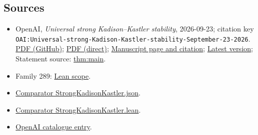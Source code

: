 \documentclass[11pt]{article}
\begin{document}
\subsection{Sources}
\begin{itemize}
\item OpenAI, \emph{Universal strong Kadison–Kastler stability}, 2026-09-23; citation key \texttt{OAI:Universal-strong-Kadison-Kastler-stability-September-23-2026}. \href{https://github.com/openai/math/blob/adc7f1241b42e322a6451854ab7e4b4c146bf78a/preprints/Universal-strong-Kadison-Kastler-stability-September-23-2026/paper.pdf}{PDF (GitHub)}; \href{https://github.com/openai/math/raw/adc7f1241b42e322a6451854ab7e4b4c146bf78a/preprints/Universal-strong-Kadison-Kastler-stability-September-23-2026/paper.pdf}{PDF (direct)}; \href{https://github.com/openai/math/blob/adc7f1241b42e322a6451854ab7e4b4c146bf78a/preprints/Universal-strong-Kadison-Kastler-stability-September-23-2026/README.md}{Manuscript page and citation}; \href{https://github.com/openai/math/blob/main/preprints/Universal-strong-Kadison-Kastler-stability-September-23-2026/paper.pdf}{Latest version}; Statement source: \href{https://github.com/openai/math/blob/adc7f1241b42e322a6451854ab7e4b4c146bf78a/preprints/Universal-strong-Kadison-Kastler-stability-September-23-2026/build/sections/01-introduction.tex\#L18}{thm:main}.
\item Family 289: \href{https://github.com/openai/math/blob/adc7f1241b42e322a6451854ab7e4b4c146bf78a/lean/docs/289.md}{Lean scope}.
\item \href{https://github.com/openai/math/blob/adc7f1241b42e322a6451854ab7e4b4c146bf78a/lean/ComparatorChallenges/StrongKadisonKastler.json}{Comparator StrongKadisonKastler.json}.
\item \href{https://github.com/openai/math/blob/adc7f1241b42e322a6451854ab7e4b4c146bf78a/lean/ComparatorChallenges/StrongKadisonKastler.lean}{Comparator StrongKadisonKastler.lean}.
\item \href{https://github.com/openai/math/blob/adc7f1241b42e322a6451854ab7e4b4c146bf78a/CONTENTS.md}{OpenAI catalogue entry}.
\end{itemize}
\end{document}
